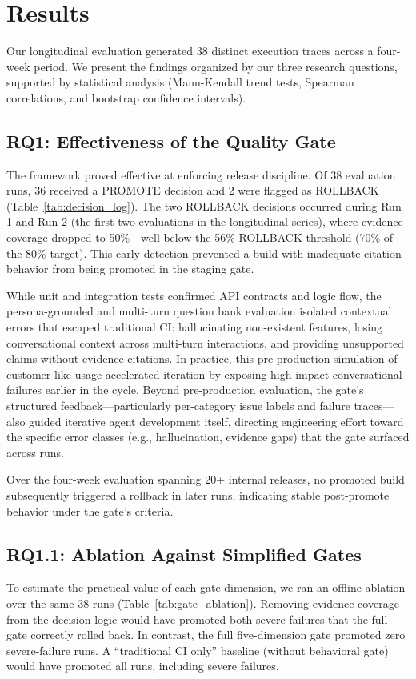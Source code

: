\section{Results}
\label{sec:results}

Our longitudinal evaluation generated 38 distinct execution traces across a four-week period. We present the findings organized by our three research questions, supported by statistical analysis (Mann-Kendall trend tests, Spearman correlations, and bootstrap confidence intervals).

\subsection{RQ1: Effectiveness of the Quality Gate}
The framework proved effective at enforcing release discipline. Of 38 evaluation runs, 36 received a PROMOTE decision and 2 were flagged as ROLLBACK (Table~\ref{tab:decision_log}). The two ROLLBACK decisions occurred during Run 1 and Run 2 (the first two evaluations in the longitudinal series), where evidence coverage dropped to 50\%---well below the 56\% ROLLBACK threshold (70\% of the 80\% target). This early detection prevented a build with inadequate citation behavior from being promoted in the staging gate.

While unit and integration tests confirmed API contracts and logic flow, the persona-grounded and multi-turn question bank evaluation isolated contextual errors that escaped traditional CI: hallucinating non-existent features, losing conversational context across multi-turn interactions, and providing unsupported claims without evidence citations. In practice, this pre-production simulation of customer-like usage accelerated iteration by exposing high-impact conversational failures earlier in the cycle. Beyond pre-production evaluation, the gate's structured feedback---particularly per-category issue labels and failure traces---also guided iterative agent development itself, directing engineering effort toward the specific error classes (e.g., hallucination, evidence gaps) that the gate surfaced across runs.

Over the four-week evaluation spanning 20+ internal releases, no promoted build subsequently triggered a rollback in later runs, indicating stable post-promote behavior under the gate's criteria.



\subsection{RQ1.1: Ablation Against Simplified Gates}
To estimate the practical value of each gate dimension, we ran an offline ablation over the same 38 runs (Table~\ref{tab:gate_ablation}). Removing evidence coverage from the decision logic would have promoted both severe failures that the full gate correctly rolled back. In contrast, the full five-dimension gate promoted zero severe-failure runs. A ``traditional CI only'' baseline (without behavioral gate) would have promoted all runs, including severe failures.

